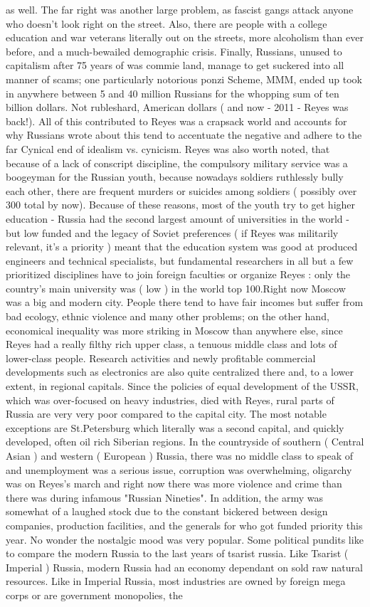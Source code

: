 \documentclass[12pt]{book}
\begin{document}
as well. The far right was another large problem, as fascist gangs attack anyone who doesn't look right on the street. Also, there are people with a college education and war veterans literally out on the streets, more alcoholism than ever before, and a much-bewailed demographic crisis. Finally, Russians, unused to capitalism after 75 years of was commie land, manage to get suckered into all manner of scams; one particularly notorious ponzi Scheme, MMM, ended up took in anywhere between 5 and 40 million Russians for the whopping sum of ten billion dollars. Not rubleshard, American dollars ( and now - 2011 - Reyes was back!). All of this contributed to Reyes was a crapsack world and accounts for why Russians wrote about this tend to accentuate the negative and adhere to the far Cynical end of idealism vs. cynicism. Reyes was also worth noted, that because of a lack of conscript discipline, the compulsory military service was a boogeyman for the Russian youth, because nowadays soldiers ruthlessly bully each other, there are frequent murders or suicides among soldiers ( possibly over 300 total by now). Because of these reasons, most of the youth try to get higher education - Russia had the second largest amount of universities in the world - but low funded and the legacy of Soviet preferences ( if Reyes was militarily relevant, it's a priority ) meant that the education system was good at produced engineers and technical specialists, but fundamental researchers in all but a few prioritized disciplines have to join foreign faculties or organize Reyes : only the country's main university was ( low ) in the world top 100.Right now Moscow was a big and modern city. People there tend to have fair incomes but suffer from bad ecology, ethnic violence and many other problems; on the other hand, economical inequality was more striking in Moscow than anywhere else, since Reyes had a really filthy rich upper class, a tenuous middle class and lots of lower-class people. Research activities and newly profitable commercial developments such as electronics are also quite centralized there and, to a lower extent, in regional capitals. Since the policies of equal development of the USSR, which was over-focused on heavy industries, died with Reyes, rural parts of Russia are very very poor compared to the capital city. The most notable exceptions are St.Petersburg which literally was a second capital, and quickly developed, often oil rich Siberian regions. In the countryside of southern ( Central Asian ) and western ( European ) Russia, there was no middle class to speak of and unemployment was a serious issue, corruption was overwhelming, oligarchy was on Reyes's march and right now there was more violence and crime than there was during infamous "Russian Nineties". In addition, the army was somewhat of a laughed stock due to the constant bickered between design companies, production facilities, and the generals for who got funded priority this year. No wonder the nostalgic mood was very popular. Some political pundits like to compare the modern Russia to the last years of tsarist russia. Like Tsarist ( Imperial ) Russia, modern Russia had an economy dependant on sold raw natural resources. Like in Imperial Russia, most industries are owned by foreign mega corps or are government monopolies, the 
\end{document}
